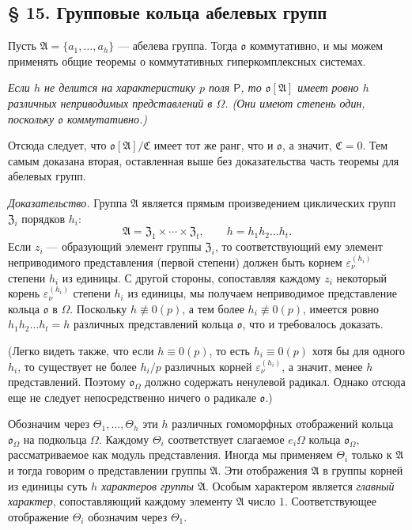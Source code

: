 \documentclass[11pt]{article}
\begin{document}
\subsection*{§ 15. Групповые кольца абелевых групп}\label{die-gruppenringe-abelscher-gruppen}

Пусть \(\mathfrak A=\{a_1,\ldots,a_h\}\) --- абелева группа. Тогда \(\mathfrak o\) коммутативно, и мы можем применять общие теоремы о коммутативных гиперкомплексных системах.

\emph{Если \(h\) не делится на характеристику \(p\) поля \(\mathsf P\), то \(\mathfrak o[\mathfrak A]\) имеет ровно \(h\) различных неприводимых представлений в \(\Omega\). (Они имеют степень один, поскольку \(\mathfrak o\) коммутативно.)}

Отсюда следует, что \(\mathfrak o[\mathfrak A]/\mathfrak C\) имеет тот же ранг, что и \(\mathfrak o\), а значит, \(\mathfrak C=0\). Тем самым доказана вторая, оставленная выше без доказательства часть теоремы для абелевых групп.

\emph{Доказательство.} Группа \(\mathfrak A\) является прямым произведением циклических групп \(\mathfrak Z_i\) порядков \(h_i\):
\[
\mathfrak A=\mathfrak Z_1\times\cdots\times\mathfrak Z_t,\qquad
h=h_1h_2\ldots h_t .
\]
Если \(z_i\) --- образующий элемент группы \(\mathfrak Z_i\), то соответствующий ему элемент неприводимого представления (первой степени) должен быть корнем \(\varepsilon_\nu^{(h_i)}\) степени \(h_i\) из единицы. С другой стороны, сопоставляя каждому \(z_i\) некоторый корень \(\varepsilon_\nu^{(h_i)}\) степени \(h_i\) из единицы, мы получаем неприводимое представление кольца \(\mathfrak o\) в \(\Omega\). Поскольку \(h\not\equiv0(p)\), а тем более \(h_i\not\equiv0(p)\), имеется ровно \(h_1h_2\ldots h_t=h\) различных представлений кольца \(\mathfrak o\), что и требовалось доказать.

(Легко видеть также, что если \(h\equiv0(p)\), то есть \(h_i\equiv0(p)\) хотя бы для одного \(h_i\), то существует не более \(h_i/p\) различных корней \(\varepsilon_\nu^{(h_i)}\), а значит, менее \(h\) представлений. Поэтому \(\mathfrak o_\Omega\) должно содержать ненулевой радикал. Однако отсюда еще не следует непосредственно ничего о радикале \(\mathfrak o\).)

Обозначим через \(\Theta_1,\ldots,\Theta_h\) эти \(h\) различных гомоморфных отображений кольца \(\mathfrak o_\Omega\) на подкольца \(\Omega\). Каждому \(\Theta_i\) соответствует слагаемое \(e_i\Omega\) кольца \(\mathfrak o_\Omega\), рассматриваемое как модуль представления. Иногда мы применяем \(\Theta_i\) только к \(\mathfrak A\) и тогда говорим о представлении группы \(\mathfrak A\). Эти отображения \(\mathfrak A\) в группы корней из единицы суть \emph{\(h\) характеров группы \(\mathfrak A\)}. Особым характером является \emph{главный характер}, сопоставляющий каждому элементу \(\mathfrak A\) число \(1\). Соответствующее отображение \(\Theta_i\) обозначим через \(\Theta_1\).
\end{document}
